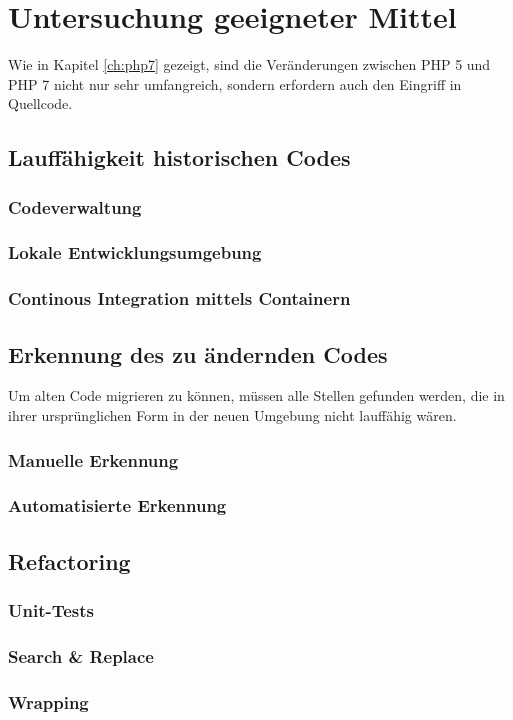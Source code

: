 \chapter{Untersuchung geeigneter Mittel}\label{ch:tools} 

Wie in Kapitel \ref{ch:php7} gezeigt, sind die Veränderungen zwischen \acs{PHP} 5 und \acs{PHP} 7 nicht nur sehr umfangreich, sondern erfordern auch den Eingriff in Quellcode.


\section{Lauffähigkeit historischen Codes}
    \subsection{Codeverwaltung}
    \subsection{Lokale Entwicklungsumgebung}
    \subsection{Continous Integration mittels Containern}

\section{Erkennung des zu ändernden Codes}
Um alten Code migrieren zu können, müssen alle Stellen gefunden werden, die in ihrer ursprünglichen Form in der neuen Umgebung nicht lauffähig wären.
    \subsection{Manuelle Erkennung}

    \subsection{Automatisierte Erkennung}

\section{Refactoring}
    \subsection{Unit-Tests}
    \subsection{Search \& Replace}
    \subsection{Wrapping}
